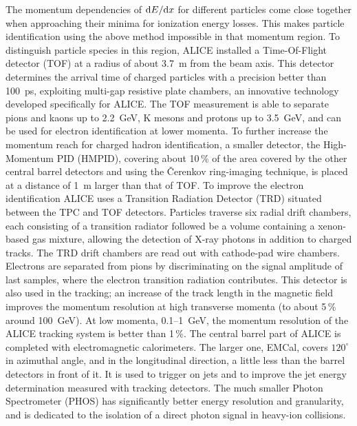The momentum dependencies of ${\rm d}E/{\rm d}x$ for different particles come close together when approaching their minima for ionization energy losses. This makes particle identification using the above method impossible in that momentum region. To distinguish particle species in this region, ALICE installed a Time-Of-Flight detector (TOF) at a radius of about 3.7~m from the beam axis. This detector determines the arrival time of charged particles with a precision better than 100~ps, exploiting multi-gap resistive plate chambers, an innovative technology developed specifically for ALICE. The TOF measurement is able to separate pions and kaons up to 2.2~GeV, K mesons and protons up to 3.5~GeV, and can be used for electron identification at lower momenta. To further increase the momentum reach for charged hadron identification, a smaller detector, the High-Momentum PID (HMPID), covering about 10\,\% of the area covered by the other central barrel detectors and using the \v{C}erenkov ring-imaging technique, is placed at a distance of 1~m larger than that of TOF. To improve the electron identification ALICE uses a Transition Radiation Detector (TRD) situated between the TPC and TOF detectors. Particles traverse six radial drift chambers, each consisting of a transition radiator followed be a volume containing a xenon-based gas mixture, allowing the detection of X-ray photons in addition to charged tracks. The TRD drift chambers are read out with cathode-pad wire chambers. Electrons are separated from pions by discriminating on the signal amplitude of last samples, where the electron transition radiation contributes. This detector is also used in the tracking; an increase of the track length in the magnetic field improves the momentum resolution at high transverse momenta (to about 5\,\% around 100~GeV). At low momenta, 0.1--1~GeV, the momentum resolution of the ALICE tracking system is better than 1\,\%. The central barrel part of ALICE is completed with electromagnetic calorimeters. The larger one, EMCal, covers $120^\circ$ in azimuthal angle, and in the longitudinal direction, a little less than the barrel detectors in front of it. It is used to trigger on jets and to improve the jet energy determination measured with tracking detectors. The much smaller Photon Spectrometer (PHOS) has significantly better energy resolution and granularity, and is dedicated to the isolation of a direct photon signal in heavy-ion collisions.

